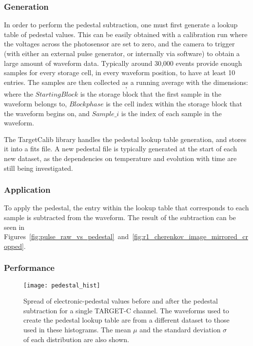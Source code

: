 \subsubsection{Generation}

In order to perform the pedestal subtraction, one must first generate a lookup table of pedestal values. This can be easily obtained with a calibration run where the voltages across the photosensor are set to zero, and the camera to trigger (with either an external pulse generator, or internally via software) to obtain a large amount of waveform data. Typically around 30,000 events provide enough samples for every storage cell, in every waveform position, to have at least 10 entries. The samples are then collected as a running average with the dimensions: 
\begin{equation}
	[Module, Channel, Starting Block, Blockphase+Sample\_i],
\end{equation}
where the $Starting Block$ is the storage block that the first sample in the waveform belongs to, $Blockphase$ is the cell index within the storage block that the waveform begins on, and $Sample\_i$ is the index of each sample in the waveform. %

The TargetCalib library handles the pedestal lookup table generation, and stores it into a \gls{fits} file. A new pedestal file is typically generated at the start of each new dataset, as the dependencies on temperature and evolution with time are still being investigated.

\subsubsection{Application}

To apply the pedestal, the entry within the lookup table that corresponds to each sample is subtracted from the waveform. The result of the subtraction can be seen in Figures~\ref{fig:pulse_raw_vs_pedestal}~and~\ref{fig:r1_cherenkov_image_mirrored_cropped}. 

\subsubsection{Performance}

\begin{figure}
	\centering
    \texttt{[image: pedestal\_hist]} 
	\caption[Spread of electronic-pedestal values before and after the pedestal subtraction.]{Spread of electronic-pedestal values before and after the pedestal subtraction for a single TARGET-C channel. The waveforms used to create the pedestal lookup table are from a different dataset to those used in these histograms. The mean $\mu$ and the standard deviation $\sigma$ of each distribution are also shown.} 
	\label{fig:pedestalresiduals}
\end{figure}

